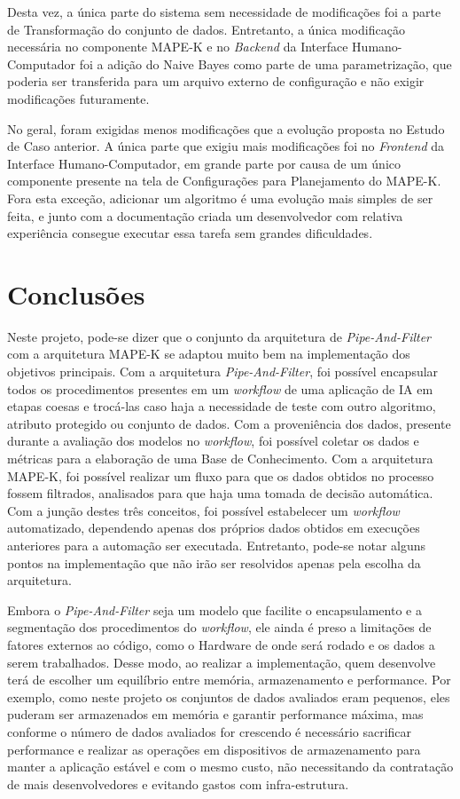 \documentclass[portugues]{ic-tese}
\begin{document}
Desta vez, a única parte do sistema sem necessidade de modificações foi a parte de Transformação do conjunto de dados. Entretanto, a única modificação necessária no componente MAPE-K e no \textit{Backend} da Interface Humano-Computador foi a adição do Naive Bayes como parte de uma parametrização, que poderia ser transferida para um arquivo externo de configuração e não exigir modificações futuramente.

No geral, foram exigidas menos modificações que a evolução proposta no Estudo de Caso anterior. A única parte que exigiu mais modificações foi no \textit{Frontend} da Interface Humano-Computador, em grande parte por causa de um único componente presente na tela de Configurações para Planejamento do MAPE-K. Fora esta exceção, adicionar um algoritmo é uma evolução mais simples de ser feita, e junto com a documentação criada um desenvolvedor com relativa experiência consegue executar essa tarefa sem grandes dificuldades.

\chapter{Conclusões}

Neste projeto, pode-se dizer que o conjunto da arquitetura de \textit{Pipe-And-Filter} com a arquitetura MAPE-K se adaptou muito bem na implementação dos objetivos principais. Com a arquitetura \textit{Pipe-And-Filter}, foi possível encapsular todos os procedimentos presentes em um \textit{workflow} de uma aplicação de IA em etapas coesas e trocá-las caso haja a necessidade de teste com outro algoritmo, atributo protegido ou conjunto de dados. Com a proveniência dos dados, presente durante a avaliação dos modelos no \textit{workflow}, foi possível coletar os dados e métricas para a elaboração de uma Base de Conhecimento. Com a arquitetura MAPE-K, foi possível realizar um fluxo para que os dados obtidos no processo fossem filtrados, analisados para que haja uma tomada de decisão automática. Com a junção destes três conceitos, foi possível estabelecer um \textit{workflow} automatizado, dependendo apenas dos próprios dados obtidos em execuções anteriores para a automação ser executada. Entretanto, pode-se notar alguns pontos na implementação que não irão ser resolvidos apenas pela escolha da arquitetura.

Embora o \textit{Pipe-And-Filter} seja um modelo que facilite o encapsulamento e a segmentação dos procedimentos do \textit{workflow}, ele ainda é preso a limitações de fatores externos ao código, como o Hardware de onde será rodado e os dados a serem trabalhados. Desse modo, ao realizar a implementação, quem desenvolve terá de escolher um equilíbrio entre memória, armazenamento e performance. Por exemplo, como neste projeto os conjuntos de dados avaliados eram pequenos, eles puderam ser armazenados em memória e garantir performance máxima, mas conforme o número de dados avaliados for crescendo é necessário sacrificar performance e realizar as operações em dispositivos de armazenamento para manter a aplicação estável e com o mesmo custo, não necessitando da contratação de mais desenvolvedores e evitando gastos com infra-estrutura.
\end{document}
